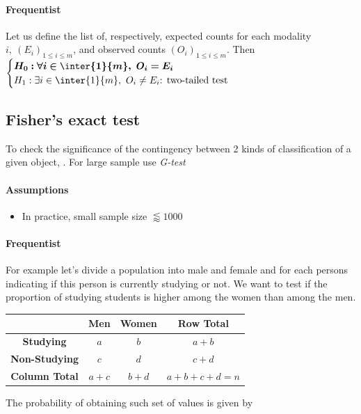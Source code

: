 \paragraph{Frequentist}
Let us define the list of, respectively, expected counts for each modality 
$i,~(E_{i})_{1\leq i\leq m}$, and observed counts $(O_{i})_{1\leq i\leq m}$.
Then
$\begin{cases}
    \bm{H_{0}: \forall i\in \inter{1}{m},~O_{i} = E_{i}}\\
    H_{1}: \exists i\in \inter{1}{m},~O_{i} \neq E_{i}\text{: two-tailed test} \\
\end{cases}$




\subsection{Fisher's exact test}
To check the significance of the contingency between 2 kinds of classification of a given
object, . For large sample use \emph{G-test}

\paragraph{Assumptions}
\begin{itemize}
    \item In practice, small sample size $\lessapprox 1000$
\end{itemize}

\paragraph{Frequentist}
For example let's divide a population into male and female and for each persons indicating
if this person is currently studying or not. We want to test if the proportion of studying
students is higher among the women than among the men.
\begin{center}
    \begin{tabular}{|*{4}{c|}}
    \hline
    & \textbf{Men} & \textbf{Women} & \textbf{Row Total}\\
    \hline
    \textbf{Studying} & $a$ & $b$ & $a+b$ \\
    \hline
    \textbf{Non-Studying} & $c$ & $d$ & $c+d$ \\
    \hline
    \textbf{Column Total} & $a+c$ & $b+d$ & $a + b + c + d = n$ \\
    \hline
    \end{tabular}
\end{center}
The probability of obtaining such set of values is given by
\begin{center}
\end{center}

